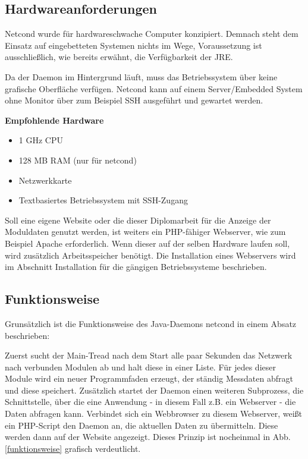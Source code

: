\documentclass[a4paper,14pt,headsepline]{scrartcl}
\begin{document}
\newpage

\subsection{Hardwareanforderungen}
Netcond wurde für hardwareschwache Computer konzipiert. Demnach steht dem Einsatz auf eingebetteten Systemen nichts im Wege, Voraussetzung ist ausschließlich, wie bereits erwähnt, die Verfügbarkeit der JRE. 

Da der Daemon im Hintergrund läuft, muss das Betriebssystem über keine grafische Oberfläche verfügen. Netcond kann auf einem Server/Embedded System ohne Monitor über zum Beispiel SSH ausgeführt und gewartet werden. 

\textbf{Empfohlende Hardware}

\begin{itemize}
	\item 1 GHz CPU
	\item 128 MB RAM (nur für netcond)
	\item Netzwerkkarte
	\item Textbasiertes Betriebssystem mit SSH-Zugang
\end{itemize}

Soll eine eigene Website oder die dieser Diplomarbeit für die Anzeige der Moduldaten genutzt werden, ist weiters ein PHP-fähiger Webserver, wie zum Beispiel Apache erforderlich. Wenn dieser auf der selben Hardware laufen soll, wird zusätzlich Arbeitsspeicher benötigt. Die Installation eines Webservers wird im Abschnitt Installation für die gängigen Betriebssysteme beschrieben. 

\newpage

\subsection{Funktionsweise}

Grunsätzlich ist die Funktionsweise des Java-Daemons netcond in einem Absatz beschrieben:

Zuerst sucht der Main-Tread nach dem Start alle paar Sekunden das Netzwerk nach verbunden Modulen ab und halt diese in einer Liste. Für jedes dieser Module wird ein neuer Programmfaden erzeugt, der ständig Messdaten abfragt und diese speichert. Zusätzlich startet der Daemon einen weiteren Subprozess, die Schnittstelle, über die eine Anwendung - in diesem Fall z.B. ein Webserver - die Daten abfragen kann. Verbindet sich ein Webbrowser zu diesem Webserver, weißt ein PHP-Script den Daemon an, die aktuellen Daten zu übermitteln. Diese werden dann auf der Website angezeigt. Dieses Prinzip ist nocheinmal in Abb. \ref{funktionsweise} grafisch verdeutlicht.
\end{document}
